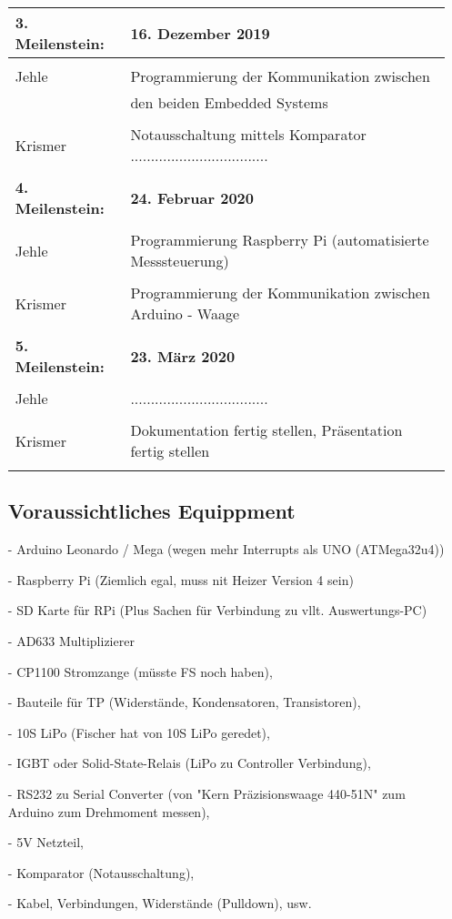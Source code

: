 \documentclass[12pt]{article}
\begin{document}
\begin{itemize}
\begin{tabular}{| l | l |}
\textbf{3. Meilenstein: } & \textbf{16. Dezember 2019} \\ \hline & \\
Jehle & Programmierung der Kommunikation zwischen \\
           & den beiden Embedded Systems \\ & \\
Krismer &  Notausschaltung mittels Komparator .................................. \\& \\ \hline 									%

\textbf{4. Meilenstein: } & \textbf{24. Februar 2020} \\ \hline & \\
Jehle & Programmierung Raspberry Pi (automatisierte Messsteuerung) \\ & \\
Krismer & Programmierung der Kommunikation zwischen Arduino - Waage \\
                 & \\ \hline 


\textbf{5. Meilenstein: } & \textbf{23. März 2020} \\ \hline & \\
Jehle & .................................. \\ & \\
Krismer & Dokumentation fertig stellen, Präsentation fertig stellen\\ & \\ \hline
\end{tabular} 






\newpage
\subsection*{Voraussichtliches Equippment}
 \item[-]Arduino Leonardo / Mega (wegen mehr Interrupts als UNO (ATMega32u4)) 
 \item[-]Raspberry Pi (Ziemlich egal, muss nit Heizer Version 4 sein) 
 \item[-]SD Karte für RPi (Plus Sachen für Verbindung zu vllt. Auswertungs-PC) 
 \item[-]AD633 Multiplizierer 
 \item[-]CP1100 Stromzange (müsste FS noch haben),  
 \item[-]Bauteile für TP (Widerstände, Kondensatoren, Transistoren),  
 \item[-]10S LiPo (Fischer hat von 10S LiPo geredet),  
 \item[-]IGBT oder Solid-State-Relais (LiPo zu Controller Verbindung),  
 \item[-]RS232 zu Serial Converter   (von "Kern Präzisionswaage 440-51N" zum  Arduino zum Drehmoment messen), 
 \item[-] 5V Netzteil, 
 \item[-] Komparator (Notausschaltung), 
 \item[-]Kabel, Verbindungen, Widerstände (Pulldown), usw. 
 

\end{itemize}
\end{document}
